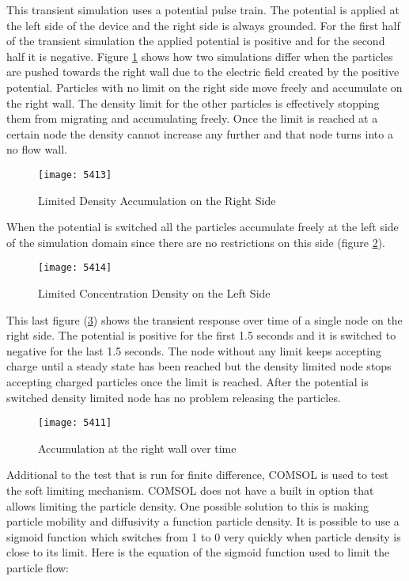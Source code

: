 \begin{doublespace}
This transient simulation uses a potential pulse train. The potential is applied at the left side of the device and the right side is always grounded. For the first half of the transient simulation the applied potential is positive and for the second half it is negative. Figure \ref{5413} shows how two simulations differ when the particles are pushed towards the right wall due to the electric field created by the positive potential. Particles with no limit on the right side move freely and accumulate on the right wall. The density limit for the other particles is effectively stopping them from migrating and accumulating freely. Once the limit is reached at a certain node the density cannot increase any further and that node turns into a no flow wall. 

\begin{figure}[!htp]
\centering
\texttt{[image: 5413]}
\caption{Limited Density Accumulation on the Right Side} 
\label{5413}
\end{figure}

When the potential is switched all the particles accumulate freely at the left side of the simulation domain since there are no restrictions on this side (figure \ref{5414}).

\begin{figure}[!htp]
\centering
\texttt{[image: 5414]}
\caption{Limited Concentration Density on the Left Side} 
\label{5414}
\end{figure}

This last figure (\ref{5411}) shows the transient response over time of a single node on the right side. The potential is positive for the first 1.5 seconds and it is switched to negative for the last 1.5 seconds. The node without any limit keeps accepting charge until a steady state has been reached but the density limited node stops accepting charged particles once the limit is reached. After the potential is switched density limited node has no problem releasing the particles.


\begin{figure}[!htp]
\centering
\texttt{[image: 5411]}
\caption{Accumulation at the right wall over time} 
\label{5411}
\end{figure}

Additional to the test that is run for finite difference, COMSOL is used to test the soft limiting mechanism. COMSOL does not have a built in option that allows limiting the particle density. One possible solution to this is making particle mobility and diffusivity a function particle density. It is possible to use a sigmoid function which switches from 1 to 0 very quickly when particle density is close to its limit. Here is the equation of the sigmoid function used to limit the particle flow:


\end{doublespace}
